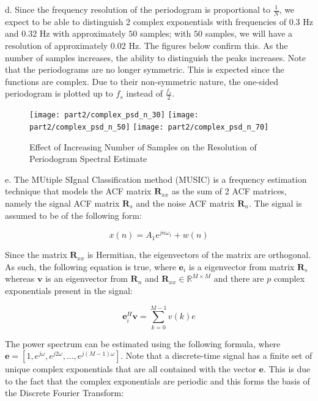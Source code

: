 \noindent{}d. Since the frequency resolution of the periodogram is proportional to $\frac{1}{N}$, we expect to be able to distinguish 2 complex exponentials with frequencies of $0.3$ Hz and $0.32$ Hz with approximately $50$ samples; with $50$ samples, we will have a resolution of approximately $0.02$ Hz. The figures below confirm this. As the number of samples increases, the ability to distinguish the peaks increases. Note that the periodograms are no longer symmetric. This is expected since the functions are complex. Due to their non-symmetric nature, the one-sided periodogram is plotted up to $f_s$ instead of $\frac{f_s}{2}$.

\begin{figure}[H]
\centering{}
\texttt{[image: part2/complex\_psd\_n\_30]}
\texttt{[image: part2/complex\_psd\_n\_50]}
\texttt{[image: part2/complex\_psd\_n\_70]}
\caption{Effect of Increasing Number of Samples on the Resolution of Periodogram Spectral Estimate}
\label{fig:complex_periodogram}
\end{figure}

\noindent{}e. The MUtiple SIgnal Classification method (MUSIC) is a frequency estimation technique that models the ACF matrix $\textbf{R}_{xx}$ as the sum of 2 ACF matrices, namely the signal ACF matrix $\textbf{R}_s$ and the noise ACF matrix $\textbf{R}_n$. The signal is assumed to be of the following form:

\begin{equation}
x(n) = A_1 e^{jn\omega_1} + w(n)
\end{equation}

\noindent{}Since the matrix $\textbf{R}_{xx}$ is Hermitian, the eigenvectors of the matrix are orthogonal. As such, the following equation is true, where $\textbf{e}_{i}$ is a eigenvector from matrix $\textbf{R}_s$ whereas $\textbf{v}$ is an eigenvector from $\textbf{R}_n$ and $\textbf{R}_{xx} \in \mathbb{R}^{M \times M}$ and there are $p$ complex exponentials present in the signal:

\begin{equation}
\textbf{e}_{i}^H \textbf{v} = \sum_{k=0}^{M-1} v(k)e%
\end{equation}

\noindent{}The power spectrum can be estimated using the following formula, where $\textbf{e} = [1, e^{j\omega}, e^{j2\omega},\dots, e^{j(M-1)\omega}]$. Note that a discrete-time signal has a finite set of unique complex exponentials that are all contained with the vector $\textbf{e}$. This is due to the fact that the complex exponentials are periodic and this forms the basis of the Discrete Fourier Transform:

